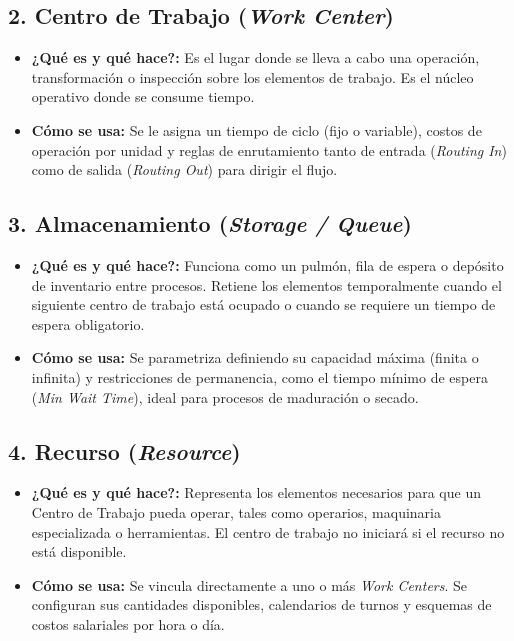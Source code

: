 \documentclass[11pt, a4paper]{article}
\begin{document}
\subsection{2. Centro de Trabajo (\textit{Work Center})}
\begin{itemize}
    \item \textbf{¿Qué es y qué hace?:} Es el lugar donde se lleva a cabo una operación, transformación o inspección sobre los elementos de trabajo. Es el núcleo operativo donde se consume tiempo.
    \item \textbf{Cómo se usa:} Se le asigna un tiempo de ciclo (fijo o variable), costos de operación por unidad y reglas de enrutamiento tanto de entrada (\textit{Routing In}) como de salida (\textit{Routing Out}) para dirigir el flujo.
\end{itemize}

\subsection{3. Almacenamiento (\textit{Storage / Queue})}
\begin{itemize}
    \item \textbf{¿Qué es y qué hace?:} Funciona como un pulmón, fila de espera o depósito de inventario entre procesos. Retiene los elementos temporalmente cuando el siguiente centro de trabajo está ocupado o cuando se requiere un tiempo de espera obligatorio.
    \item \textbf{Cómo se usa:} Se parametriza definiendo su capacidad máxima (finita o infinita) y restricciones de permanencia, como el tiempo mínimo de espera (\textit{Min Wait Time}), ideal para procesos de maduración o secado.
\end{itemize}

\subsection{4. Recurso (\textit{Resource})}
\begin{itemize}
    \item \textbf{¿Qué es y qué hace?:} Representa los elementos necesarios para que un Centro de Trabajo pueda operar, tales como operarios, maquinaria especializada o herramientas. El centro de trabajo no iniciará si el recurso no está disponible.
    \item \textbf{Cómo se usa:} Se vincula directamente a uno o más \textit{Work Centers}. Se configuran sus cantidades disponibles, calendarios de turnos y esquemas de costos salariales por hora o día.
\end{itemize}
\end{document}
